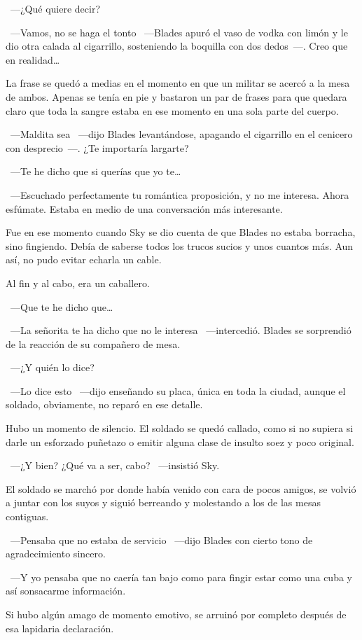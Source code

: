~---¿Qué quiere decir?

~---Vamos, no se haga el tonto ~---Blades apuró el vaso de vodka con limón y le dio otra calada al cigarrillo, sosteniendo la boquilla con dos dedos~---. Creo que en realidad\dots

La frase se quedó a medias en el momento en que un militar se acercó a la mesa de ambos. Apenas se tenía en pie y bastaron un par de frases para que quedara claro que toda la sangre estaba en ese momento en una sola parte del cuerpo.

~---Maldita sea ~---dijo Blades levantándose, apagando el cigarrillo en el cenicero con desprecio~---. ¿Te importaría largarte?

~---Te he dicho que si querías que yo te\dots

~---Escuchado perfectamente tu romántica proposición, y no me interesa. Ahora esfúmate. Estaba en medio de una conversación más interesante.

Fue en ese momento cuando Sky se dio cuenta de que Blades no estaba borracha, sino fingiendo. Debía de saberse todos los trucos sucios y unos cuantos más. Aun así, no pudo evitar echarla un cable.

Al fin y al cabo, era un caballero.

~---Que te he dicho que\dots

~---La señorita te ha dicho que no le interesa ~---intercedió. Blades se sorprendió de la reacción de su compañero de mesa.

~---¿Y quién lo dice?

~---Lo dice esto ~---dijo enseñando su placa, única en toda la ciudad, aunque el soldado, obviamente, no reparó en ese detalle.

Hubo un momento de silencio. El soldado se quedó callado, como si no supiera si darle un esforzado puñetazo o emitir alguna clase de insulto soez y poco original.

~---¿Y bien? ¿Qué va a ser, cabo? ~---insistió Sky.

El soldado se marchó por donde había venido con cara de pocos amigos, se volvió a juntar con los suyos y siguió berreando y molestando a los de las mesas contiguas.

~---Pensaba que no estaba de servicio ~---dijo Blades con cierto tono de agradecimiento sincero.

~---Y yo pensaba que no caería tan bajo como para fingir estar como una cuba y así sonsacarme información.

Si hubo algún amago de momento emotivo, se arruinó por completo después de esa lapidaria declaración.

